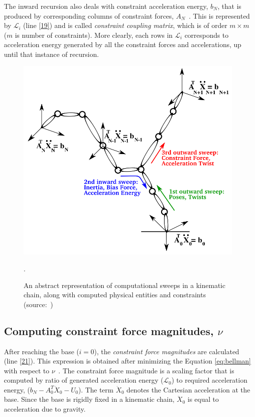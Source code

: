 The inward recursion also deals with constraint acceleration energy, $b_N$, that is produced by corresponding columns of constraint forces, $A_N$~\cite{shakhimardanov2015composable}. This is represented by $\mathcal{L}_i$ (line \ref{19}) and is called \textit{constraint coupling matrix}, which is of order $m \times m$ ($m$ is number of constraints). More clearly, each rows in $\mathcal{L}_i$ corresponds to acceleration energy generated by all the constraint forces and accelerations, up until that instance of recursion.

\begin{figure}[h!]
	\label{fig:sweep}
	\centering
	\includegraphics[scale=0.35]{images/sweep.png}
	\caption{An abstract representation of computational sweeps in a kinematic chain, along with computed physical entities and constraints (source:~\cite{shakhimardanov2015composable})}.	
\end{figure}

\subsection{Computing constraint force magnitudes, $\nu$}

After reaching the base ($i = 0$), the \textit{constraint force magnitudes} are calculated (line \ref{21}). This expression is obtained after minimizing the Equation \ref{eq:bellman} with respect to $\nu$~\cite{shakhimardanov2015composable}. The constraint force magnitude is a scaling factor that is computed by ratio of generated acceleration energy ($\mathcal{L}_0$) to required acceleration energy, ($b_N -  A_0^T \ddot{X}_0 - U_0 $). The term $\ddot{X}_0$ denotes the Cartesian acceleration at the base. Since the base is rigidly fixed in a kinematic chain, $\ddot{X}_0$ is equal to acceleration due to gravity. 

